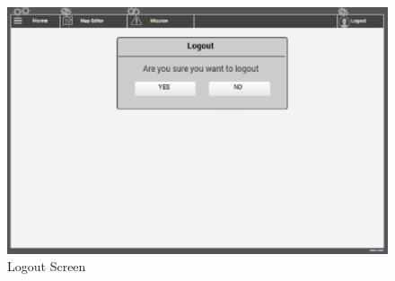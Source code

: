 \begin{figure}[htbp]
\begin{center}
 \caption{\label{fig:W5} Logout Screen}
   \includegraphics[width=150mm]{./images/Web/logout.eps}
\end{center}
\end{figure}



